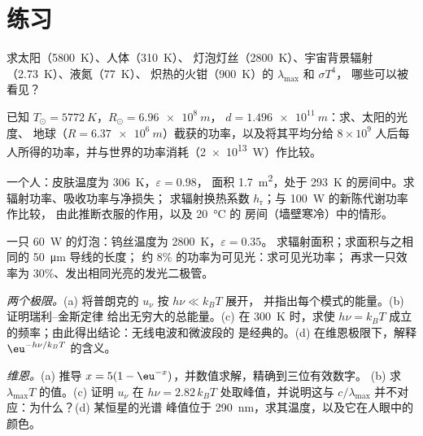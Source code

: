 \section{练习}

\begin{exercise}[$\star$]\label{exo:b2:thermal-radiation:1}
求太阳（\qty{5800}{K}）、人体（\qty{310}{K}）、
灯泡灯丝（\qty{2800}{K}）、宇宙背景辐射（\qty{2.73}{K}）、液氮（\qty{77}{K}）、
炽热的火钳（\qty{900}{K}）的 $\lambda_{\max}$ 和 $\sigma T^4$，
哪些可以被看见？
\end{exercise}

\begin{exercise}[$\star$]\label{exo:b2:thermal-radiation:2}
已知 $T_\odot = \qty{5772}{K}$，$R_\odot = \qty{6.96e8}{m}$，
$d = \qty{1.496e11}{m}$：求、太阳的光度、
地球（$R = \qty{6.37e6}{m}$）截获的功率，以及将其平均分给 $8 \times 10^9$
人后每人所得的功率，并与世界的功率消耗（\qty{2e13}{W}）作比较。
\end{exercise}

\begin{exercise}[$\star$]\label{exo:b2:thermal-radiation:3}
一个人：皮肤温度为 \qty{306}{K}，$\varepsilon = 0.98$，
面积 \qty{1.7}{m^2}，处于 \qty{293}{K} 的房间中。求辐射功率、吸收功率与净损失；
求辐射换热系数 $h_{\text{r}}$；与 \qty{100}{W} 的新陈代谢功率作比较，
由此推断衣服的作用，以及 \qty{20}{\celsius} 的
房间（墙壁寒冷）中的情形。
\end{exercise}

\begin{exercise}[$\star$]\label{exo:b2:thermal-radiation:4}
一只 \qty{60}{W} 的灯泡：钨丝温度为 \qty{2800}{K}，$\varepsilon = 0.35$。
求辐射面积；求面积与之相同的 \qty{50}{\micro m} 导线的长度；
约 $8\%$ 的功率为可见光：求可见光功率；
再求一只效率为 $30\%$、发出相同光亮的发光二极管。
\end{exercise}

\begin{exercise}[$\star\star$]\label{exo:b2:thermal-radiation:5}
\emph{两个极限。}(a) 将普朗克的 $u_\nu$ 按 $h\nu \ll k_BT$ 展开，
并指出每个模式的能量。(b) 证明瑞利–金斯定律
给出无穷大的总能量。(c) 在 \qty{300}{K} 时，求使
$h\nu = k_BT$ 成立的频率；由此得出结论：无线电波和微波段的
是经典的。(d) 在维恩极限下，解释 $\eu^{-h\nu/k_BT}$ 的含义。
\end{exercise}

\begin{exercise}[$\star\star$]\label{exo:b2:thermal-radiation:6}
\emph{维恩。}(a) 推导 $x = 5(1 - \eu^{-x})$，并数值求解，精确到三位有效数字。
(b) 求 $\lambda_{\max}T$ 的值。(c) 证明 $u_\nu$
在 $h\nu = 2.82\,k_BT$ 处取峰值，并说明这与
$c/\lambda_{\max}$ 并不对应：为什么？(d) 某恒星的光谱
峰值位于 \qty{290}{nm}，求其温度，以及它在人眼中的颜色。
\end{exercise}

